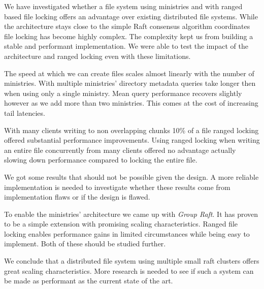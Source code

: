 We have investigated whether a file system using ministries and with ranged based file locking offers an advantage over existing distributed file systems. While the architecture stays close to the simple Raft consensus algorithm coordinates file locking has become highly complex. The complexity kept us from building a stable and performant implementation. We were able to test the impact of the architecture and ranged locking even with these limitations.

The speed at which we can create files scales almost linearly with the number of ministries. With multiple ministries' directory metadata queries take longer then when using only a single ministry. Mean query performance recovers slightly however as we add more than two ministries. This comes at the cost of increasing tail latencies.

With many clients writing to non overlapping chunks 10\% of a file ranged locking offered substantial performance improvements. Using ranged locking when writing an entire file concurrently from many clients offered no advantage actually slowing down performance compared to locking the entire file.

We got some results that should not be possible given the design. A more reliable implementation is needed to investigate whether these results come from implementation flaws or if the design is flawed. 

To enable the ministries' architecture we came up with \textit{Group Raft}. It has proven to be a simple extension with promising scaling characteristics. Ranged file locking enables performance gains in limited circumstances while being easy to implement. Both of these should be studied further. 

We conclude that a distributed file system using multiple small raft clusters offers great scaling characteristics. More research is needed to see if such a system can be made as performant as the current state of the art.
